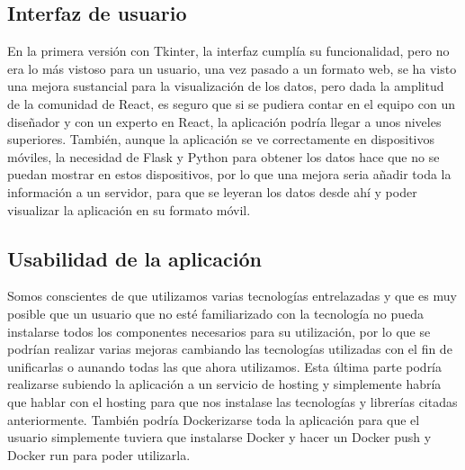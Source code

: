 \subsection*{Interfaz de usuario}
En la primera versión con Tkinter, la interfaz cumplía su funcionalidad, pero no era lo más vistoso para un usuario, una vez pasado a un formato web, se ha visto una mejora sustancial para la visualización de los datos, pero dada la amplitud de la comunidad de React, es seguro que si se pudiera contar en el equipo con un diseñador y con un experto en React, la aplicación podría llegar a unos niveles superiores. También, aunque la aplicación se ve correctamente en dispositivos móviles, la necesidad de Flask y Python para obtener los datos hace que no se puedan mostrar en estos dispositivos, por lo que una mejora seria añadir toda la información a un servidor, para que se leyeran los datos desde ahí y poder visualizar la aplicación en su formato móvil.

\subsection*{Usabilidad de la aplicación}
Somos conscientes de que utilizamos varias tecnologías entrelazadas y que es muy posible que un usuario que no esté familiarizado con la tecnología no pueda instalarse todos los componentes necesarios para su utilización, por lo que se podrían realizar varias mejoras cambiando las tecnologías utilizadas con el fin de unificarlas o aunando todas las que ahora utilizamos. Esta última parte podría realizarse subiendo la aplicación a un servicio de hosting y simplemente habría que hablar con el hosting para que nos instalase las tecnologías y librerías citadas anteriormente. También podría Dockerizarse toda la aplicación para que el usuario simplemente tuviera que instalarse Docker y hacer un Docker push y Docker run para poder utilizarla.